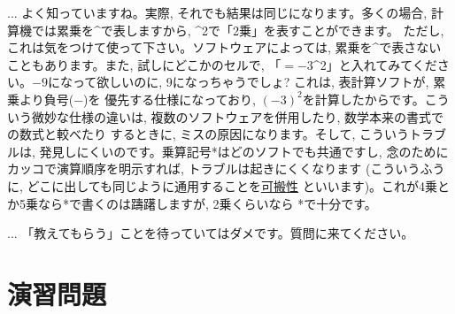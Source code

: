 \begin{faq}{\small{}
 ... よく知っていますね。実際, それでも結果は同じになります。多くの場合, 
計算機では累乗を\^{}で表しますから, \^{}2で「2乗」を表すことができます。
ただし, これは気をつけて使って下さい。ソフトウェアによっては, 
累乗を\^{}で表さないこともあります。また, 試しにどこかのセルで, 
「$=-3$\^{}2」と入れてみてください。$-9$になって欲しいのに, 
9になっちゃうでしょ? これは, 表計算ソフトが, 累乗より負号($-$)を
優先する仕様になっており, $(-3)^2$を計算したからです。こういう微妙な仕様の違いは, 
複数のソフトウェアを併用したり, 数学本来の書式での数式と較べたり
するときに, ミスの原因になります。そして, こういうトラブルは, 
発見しにくいのです。乗算記号*はどのソフトでも共通ですし, 
念のためにカッコで演算順序を明示すれば, トラブルは起きにくくなります
(こういうふうに, どこに出しても同じように通用することを\underline{可搬性}
といいます)。これが4乗とか5乗なら*で書くのは躊躇しますが, 2乗くらいなら
*で十分です。}\end{faq}

\begin{faq}{\small{}
... 「教えてもらう」ことを待っていてはダメです。質問に来てください。}\end{faq}
\vv


\section*{演習問題}

